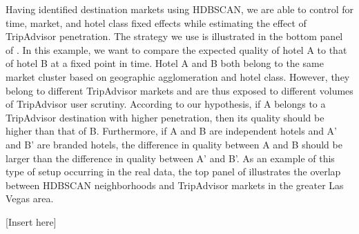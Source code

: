 \documentclass[12pt, leqno]{article}
\begin{document}
Having identified destination markets using HDBSCAN, we are able to control for time, market, and hotel class fixed effects while estimating the effect of TripAdvisor penetration. The strategy we use is illustrated in the bottom panel of . In this example, we want to compare the expected quality of hotel A to that of hotel B at a fixed point in time. Hotel A and B both belong to the same market cluster based on geographic agglomeration and hotel class. However, they belong to different TripAdvisor markets and are thus exposed to different volumes of TripAdvisor user scrutiny. According to our hypothesis, if A belongs to a TripAdvisor destination with higher penetration, then its quality should be higher than that of B. Furthermore, if A and B are independent hotels and A' and B' are branded hotels, the difference in quality between A and B should be larger than the difference in quality between A' and B'. As an example of this type of setup occurring in the real data, the top panel of  illustrates the overlap between HDBSCAN neighborhoods and TripAdvisor markets in the greater Las Vegas area.

[Insert  here]
\end{document}

